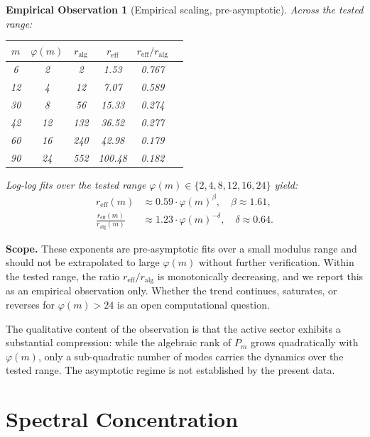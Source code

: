 \documentclass[11pt,a4paper]{article}
\newtheorem{observation}{Empirical Observation}
\begin{document}
\begin{observation}[Empirical scaling, pre-asymptotic]
\label{obs:scaling}
Across the tested range:

\begin{center}
\begin{tabular}{cccccc}
\toprule
$m$ & $\varphi(m)$ & $r_{\text{alg}}$ & $r_{\text{eff}}$ & $r_{\text{eff}}/r_{\text{alg}}$ \\
\midrule
6 & 2 & 2 & 1.53 & 0.767 \\
12 & 4 & 12 & 7.07 & 0.589 \\
30 & 8 & 56 & 15.33 & 0.274 \\
42 & 12 & 132 & 36.52 & 0.277 \\
60 & 16 & 240 & 42.98 & 0.179 \\
90 & 24 & 552 & 100.48 & 0.182 \\
\bottomrule
\end{tabular}
\end{center}

Log-log fits over the tested range $\varphi(m) \in \{2, 4, 8, 12, 16, 24\}$ yield:
\begin{align}
r_{\text{eff}}(m) &\approx 0.59 \cdot \varphi(m)^{\beta}, \quad \beta \approx 1.61,\\
\frac{r_{\text{eff}}(m)}{r_{\text{alg}}(m)} &\approx 1.23 \cdot \varphi(m)^{-\delta}, \quad \delta \approx 0.64.
\end{align}
\end{observation}

\textbf{Scope.} These exponents are pre-asymptotic fits over a small modulus range and should not be extrapolated to large $\varphi(m)$ without further verification. Within the tested range, the ratio $r_{\text{eff}}/r_{\text{alg}}$ is monotonically decreasing, and we report this as an empirical observation only. Whether the trend continues, saturates, or reverses for $\varphi(m) > 24$ is an open computational question.

The qualitative content of the observation is that the active sector exhibits a substantial compression: while the algebraic rank of $P_m$ grows quadratically with $\varphi(m)$, only a sub-quadratic number of modes carries the dynamics over the tested range. The asymptotic regime is not established by the present data.

\section{Spectral Concentration}
\label{sec:spectrum}
\end{document}
